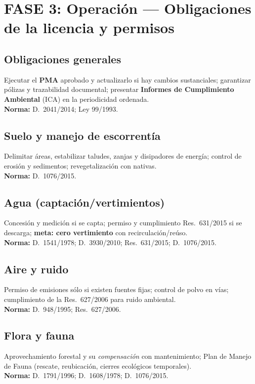 \section{FASE 3: Operación — Obligaciones de la licencia y permisos}

\subsection{Obligaciones generales}
Ejecutar el \textbf{PMA} aprobado y actualizarlo si hay cambios sustanciales; garantizar pólizas y trazabilidad documental; presentar \textbf{Informes de Cumplimiento Ambiental} (ICA) en la periodicidad ordenada.\\
\textbf{Norma:} D.~2041/2014; Ley 99/1993.

\subsection{Suelo y manejo de escorrentía}
Delimitar áreas, estabilizar taludes, zanjas y disipadores de energía; control de erosión y sedimentos; revegetalización con nativas.\\
\textbf{Norma:} D.~1076/2015.

\subsection{Agua (captación/vertimientos)}
Concesión y medición si se capta; permiso y cumplimiento Res.~631/2015 si se descarga; \textbf{meta: cero vertimiento} con recirculación/reúso.\\
\textbf{Norma:} D.~1541/1978; D.~3930/2010; Res.~631/2015; D.~1076/2015.

\subsection{Aire y ruido}
Permiso de emisiones sólo si existen fuentes fijas; control de polvo en vías; cumplimiento de la Res.~627/2006 para ruido ambiental.\\
\textbf{Norma:} D.~948/1995; Res.~627/2006.

\subsection{Flora y fauna}
Aprovechamiento forestal y su \emph{compensación} con mantenimiento; Plan de Manejo de Fauna (rescate, reubicación, cierres ecológicos temporales).\\
\textbf{Norma:} D.~1791/1996; D.~1608/1978; D.~1076/2015.

